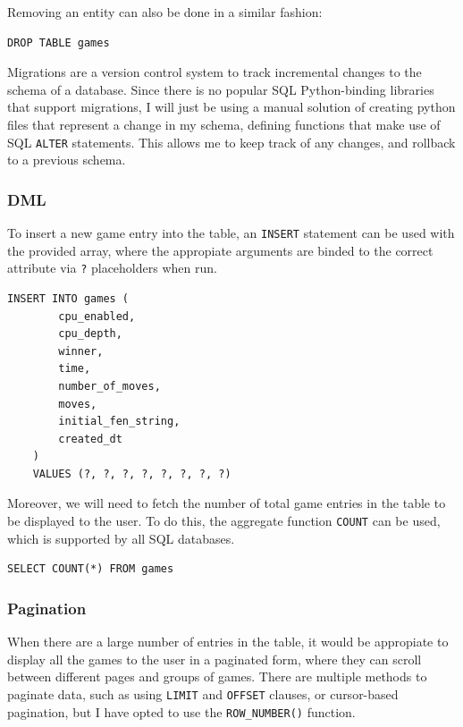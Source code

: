 \documentclass[../main/main.tex]{subfiles}
\begin{document}
\noindent Removing an entity can also be done in a similar fashion:

\begin{lstlisting}[language=sqlite, frame=lines]
    DROP TABLE games
\end{lstlisting} 

Migrations are a version control system to track incremental changes to the schema of a database. Since there is no popular SQL Python-binding libraries that support migrations, I will just be using a manual solution of creating python files that represent a change in my schema, defining functions that make use of SQL \lstinline[language=sqlite]{ALTER} statements. This allows me to keep track of any changes, and rollback to a previous schema.

\subsubsection*{DML}
To insert a new game entry into the table, an \lstinline[language=sqlite]{INSERT} statement can be used with the provided array, where the appropiate arguments are binded to the correct attribute via \lstinline[language=Python]{?} placeholders when run.

\begin{lstlisting}[language=sqlite, frame=lines]
    INSERT INTO games (
        cpu_enabled,
        cpu_depth,
        winner,
        time,
        number_of_moves,
        moves,
        initial_fen_string,
        created_dt
    )
    VALUES (?, ?, ?, ?, ?, ?, ?, ?)
\end{lstlisting}

Moreover, we will need to fetch the number of total game entries in the table to be displayed to the user. To do this, the aggregate function \lstinline[language=sqlite]{COUNT} can be used, which is supported by all SQL databases.

\begin{lstlisting}[language=sqlite, frame=lines]
    SELECT COUNT(*) FROM games
\end{lstlisting}

\subsubsection*{Pagination}
When there are a large number of entries in the table, it would be appropiate to display all the games to the user in a paginated form, where they can scroll between different pages and groups of games. There are multiple methods to paginate data, such as using \lstinline[language=sqlite]{LIMIT} and \lstinline[language=sqlite]{OFFSET} clauses, or cursor-based pagination, but I have opted to use the \lstinline[language=sqlite]{ROW_NUMBER()} function.
\end{document}
